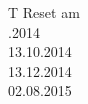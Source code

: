 \begin{tabzahlen}{T}
Reset am \\
.2014 \\
13.10.2014 \\
13.12.2014 \\
02.08.2015 \\
\end{tabzahlen}
